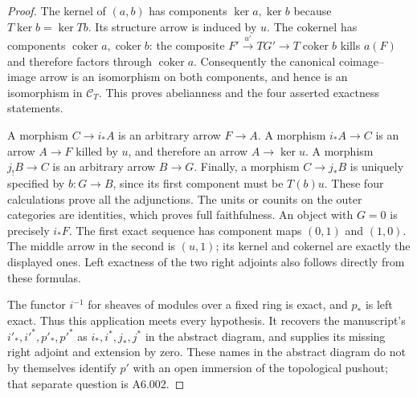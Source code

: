 \begin{proof}
The kernel of $(a,b)$ has components $\ker a,\ker b$ because
$T\ker b=\ker Tb$. Its structure arrow is induced by $u$.
The cokernel has components $\operatorname{coker}a,
\operatorname{coker}b$: the composite
$F'\xrightarrow{u'}TG'\to T\operatorname{coker}b$ kills $a(F)$
and therefore factors through $\operatorname{coker}a$.
Consequently the canonical coimage--image arrow is an isomorphism
on both components, and hence is an isomorphism in $\mathcal C_T$.
This proves abelianness and the four asserted exactness statements.

A morphism $C\to i_*A$ is an arbitrary arrow $F\to A$.
A morphism $i_*A\to C$ is an arrow $A\to F$ killed by $u$, and
therefore an arrow $A\to\ker u$. A morphism $j_!B\to C$ is an
arbitrary arrow $B\to G$. Finally, a morphism $C\to j_*B$ is
uniquely specified by $b:G\to B$, since its first component must
be $T(b)u$. These four calculations prove all the adjunctions.
The units or counits on the outer categories are identities, which
proves full faithfulness. An object with $G=0$ is precisely $i_*F$.
The first exact sequence has component maps $(0,1)$ and $(1,0)$.
The middle arrow in the second is $(u,1)$; its kernel and cokernel
are exactly the displayed ones. Left exactness of the two right
adjoints also follows directly from these formulas.

The functor $i^{-1}$ for sheaves of modules over a fixed ring is exact,
and $p_*$ is left exact. Thus this application meets every hypothesis.
It recovers the manuscript's $i'_*,i'^*,p'_*,p'^*$ as
$i_*,i^*,j_*,j^*$ in the abstract diagram, and supplies its missing
right adjoint and extension by zero. These names in the abstract
diagram do not by themselves identify $p'$ with an open immersion
of the topological pushout; that separate question is A6.002.
\end{proof}

